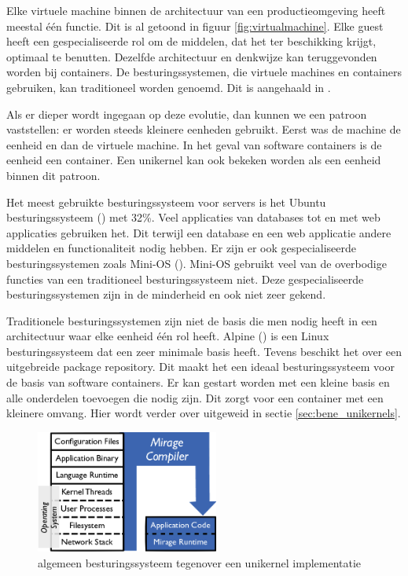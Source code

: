 Elke virtuele machine binnen de architectuur van een productieomgeving heeft meestal één functie. Dit is al getoond in figuur \ref{fig:virtualmachine}. Elke guest heeft een gespecialiseerde rol om de middelen, dat het ter beschikking krijgt, optimaal te benutten.
Dezelfde architectuur en denkwijze kan teruggevonden worden bij containers. De besturingssystemen, die virtuele machines en containers gebruiken, kan traditioneel worden genoemd. Dit is aangehaald in \cite{madhavapeddy_unikernels_2013}.

Als er dieper wordt ingegaan op deze evolutie, dan kunnen we een patroon vaststellen: er worden steeds kleinere eenheden gebruikt. Eerst was de machine de eenheid en dan de virtuele machine. In het geval van software containers is de eenheid een container. Een unikernel kan ook bekeken worden als een eenheid binnen dit patroon.

Het meest gebruikte besturingssysteem voor servers is het Ubuntu besturingssysteem (\cite{matthias_gelbmann_ubuntu_2016}) met 32\%. Veel applicaties van databases tot en met web applicaties gebruiken het. Dit terwijl een database en een web applicatie andere middelen en functionaliteit nodig hebben.
Er zijn er ook gespecialiseerde besturingssystemen zoals Mini-OS (\cite{satya_popuri_tour_????}). Mini-OS gebruikt veel van de overbodige functies van een traditioneel besturingssysteem niet. Deze gespecialiseerde besturingssystemen zijn in de minderheid en ook niet zeer gekend.

Traditionele besturingssystemen zijn niet de basis die men nodig heeft in een architectuur waar elke eenheid één rol heeft. Alpine (\cite{alpine_linux_development_team_alpine_????}) is een Linux besturingssysteem dat een zeer minimale basis heeft. Tevens beschikt het over een uitgebreide package repository. Dit maakt het een ideaal besturingssysteem voor de basis van software containers. Er kan gestart worden met een kleine basis en alle onderdelen toevoegen die nodig zijn. Dit zorgt voor een container met een kleinere omvang. Hier wordt verder over uitgeweid in sectie \ref{sec:bene_unikernels}.

\begin{figure}
    \centering
    \includegraphics[width=6cm]{img/unikernel}
    \caption{algemeen besturingssysteem tegenover een unikernel implementatie \cite{madhavapeddy_unikernels_2013}}
    \label{fig:unikernel}
\end{figure}

